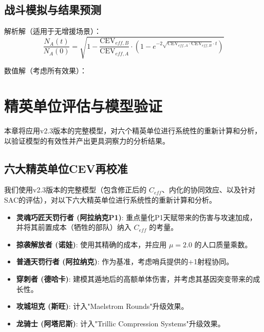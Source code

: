 \documentclass[a4paper,12pt]{article}
\begin{document}
\subsection{战斗模拟与结果预测}
解析解（适用于无增援场景）：
\begin{equation}
\frac{N_A(t)}{N_A(0)} = \sqrt{1 - \frac{\text{CEV}_{eff,B}}{\text{CEV}_{eff,A}} \cdot (1 - e^{-2\sqrt{\text{CEV}_{eff,A} \cdot \text{CEV}_{eff,B}} \cdot t})}
\end{equation}

数值解（考虑所有效果）：
\begin{center}
\end{center}

\section{精英单位评估与模型验证}

本章将应用v2.3版本的完整模型，对六个精英单位进行系统性的重新计算和分析，以验证模型的有效性并产出更具洞察力的分析结果。

\subsection{六大精英单位CEV再校准}
我们使用v2.3版本的完整模型（包含修正后的 $C_{eff}$、内化的协同效应、以及针对SAC的评估），对以下六大精英单位进行系统性的重新计算和分析。

\begin{itemize}
    \item \textbf{灵魂巧匠天罚行者 (阿拉纳克P1)}: 重点量化P1天赋带来的伤害与攻速加成，并将其前置成本（牺牲的部队）纳入 $C_{eff}$ 的考量。
    \item \textbf{掠袭解放者 (诺娃)}: 使用其精确的成本，并应用 $\mu=2.0$ 的人口质量乘数。
    \item \textbf{普通天罚行者 (阿拉纳克)}: 作为基准，考虑哨兵提供的+1射程协同。
    \item \textbf{穿刺者 (德哈卡)}: 建模其遁地后的高额单体伤害，并考虑其基因突变带来的成长性。
    \item \textbf{攻城坦克 (斯旺)}: 计入"Maelstrom Rounds"升级效果。
    \item \textbf{龙骑士 (阿塔尼斯)}: 计入"Trillic Compression Systems"升级效果。
\end{itemize}
\end{document}
